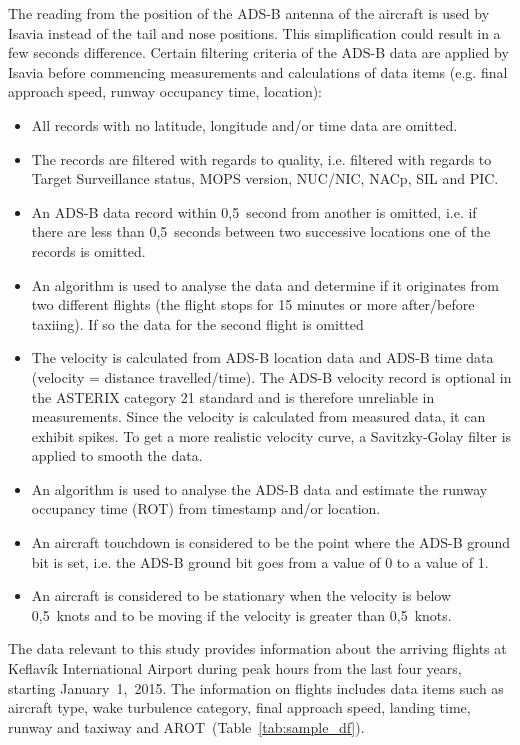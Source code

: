 The reading from the position of the ADS-B antenna of the aircraft is used by Isavia instead of the tail and nose positions. This simplification could result in a few seconds difference. Certain filtering criteria of the ADS-B data are applied by Isavia before commencing measurements and calculations of data items (e.g. final approach speed, runway occupancy time, location):~\cite{isavia_wiki}
\begin{itemize}
    \item All records with no latitude, longitude and/or time data are omitted.
    \item The records are filtered with regards to quality, i.e. filtered with regards to Target Surveillance status, MOPS version, NUC/NIC, NACp, SIL and PIC.
    \item An ADS-B data record within 0,5~second from another is omitted, i.e. if there are less than 0,5~seconds between two successive locations one of the records is omitted.
    \item An algorithm is used to analyse the data and determine if it originates from two different flights (the flight stops for 15 minutes or more after/before taxiing). If so the data for the second flight is omitted
    \item The velocity is calculated from ADS-B location data and ADS-B time data (velocity = distance travelled/time). The ADS-B velocity record is optional in the ASTERIX category 21 standard and is therefore unreliable in measurements. Since the velocity is calculated from measured data, it can exhibit spikes. To get a more realistic velocity curve, a Savitzky-Golay filter is applied to smooth the data.
    \item An algorithm is used to analyse the ADS-B data and estimate the runway occupancy time (ROT) from timestamp and/or location.
    \item An aircraft touchdown is considered to be the point where the ADS-B ground bit is set, i.e. the ADS-B ground bit goes from a value of 0 to a value of 1.
    \item An aircraft is considered to be stationary when the velocity is below 0,5~knots and to be moving if the velocity is greater than 0,5~knots.
    
\end{itemize}

The data relevant to this study provides information about the arriving flights at Keflavík International Airport during peak hours from the last four years, starting January~1,~2015. The information on flights includes data items such as aircraft type, wake turbulence category, final approach speed, landing time, runway and taxiway and AROT~(Table~\ref{tab:sample_df}).

